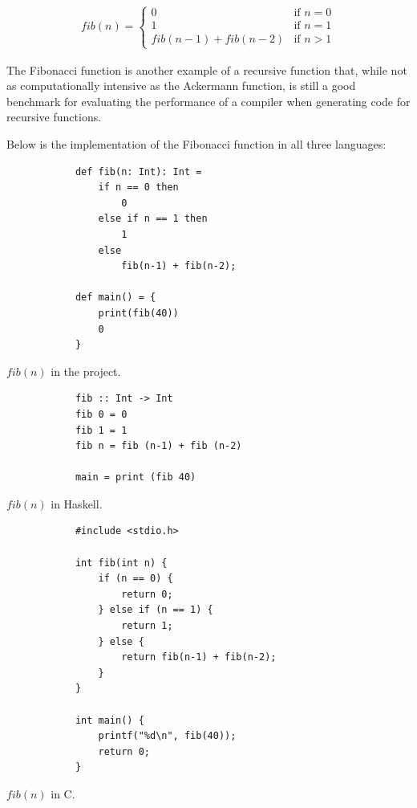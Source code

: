 \singlespacing
\vspace{-0.7cm}
\begin{align*}
    fib(n) = \begin{cases}
        0 & \text{if } n = 0 \\
        1 & \text{if } n = 1 \\
        fib(n - 1) + fib(n - 2) & \text{if } n > 1
    \end{cases}
\end{align*}
\doublespacing

The Fibonacci function is another example of a recursive function that, while not as
computationally intensive as the Ackermann function, is still a good benchmark for evaluating the
performance of a compiler when generating code for recursive functions.

Below is the implementation of the Fibonacci function in all three languages:

\vspace{0.3cm}
\begin{tcbitemize}[raster columns=3, raster equal height=rows,size=small,space to upper]
    \tcbitem
        \footnotesize
        \begin{verbatim}
            def fib(n: Int): Int =
                if n == 0 then
                    0
                else if n == 1 then
                    1
                else
                    fib(n-1) + fib(n-2);

            def main() = {
                print(fib(40))
                0
            }
        \end{verbatim}
        \tcblower
        \footnotesize $fib(n)$ in the project.
    \tcbitem
        \footnotesize
        \begin{verbatim}
            fib :: Int -> Int
            fib 0 = 0
            fib 1 = 1
            fib n = fib (n-1) + fib (n-2)

            main = print (fib 40)
        \end{verbatim}
        \vfill
        \tcblower
        \footnotesize $fib(n)$ in Haskell.
    \tcbitem
        \scriptsize
        \begin{verbatim}
            #include <stdio.h>

            int fib(int n) {
                if (n == 0) {
                    return 0;
                } else if (n == 1) {
                    return 1;
                } else {
                    return fib(n-1) + fib(n-2);
                }
            }

            int main() {
                printf("%d\n", fib(40));
                return 0;
            }
        \end{verbatim}
        \tcblower
        \footnotesize $fib(n)$ in C.
\end{tcbitemize}
\vspace{0.4cm}

